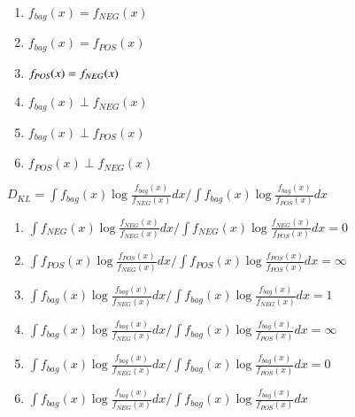 \begin{enumerate}
  \item $f_{bag}(x) = f_{NEG}(x)$
  \item $f_{bag}(x) = f_{POS}(x)$
  \item $f_{\text{\scriptsize{{\it POS}}}}(x) = f_{NEG}(x)$
  \item $f_{bag}(x) \perp f_{NEG}(x)$
  \item $f_{bag}(x) \perp f_{POS}(x)$
  \item $f_{POS}(x) \perp f_{NEG}(x)$
\end{enumerate}
$D_{KL} = \int f_{bag}(x) \log \frac{f_{bag}(x)}{f_{NEG}(x)} dx / \int f_{bag}(x) \log \frac{f_{bag}(x)}{f_{POS}(x)} dx$
\begin{enumerate}
  \item $\int f_{NEG}(x) \log \frac{f_{NEG}(x)}{f_{NEG}(x)} dx / \int f_{NEG}(x) \log \frac{f_{NEG}(x)}{f_{POS}(x)} dx = 0$
  \item $ \int f_{POS}(x) \log \frac{f_{POS}(x)}{f_{NEG}(x)} dx / \int f_{POS}(x) \log \frac{f_{POS}(x)}{f_{POS}(x)} dx = \infty$
  \item $\int f_{bag}(x) \log \frac{f_{bag}(x)}{f_{NEG}(x)} dx / \int f_{bag}(x) \log \frac{f_{bag}(x)}{f_{NEG}(x)} dx = 1$
  \item $\int f_{bag}(x) \log \frac{f_{bag}(x)}{f_{NEG}(x)} dx / \int f_{bag}(x) \log \frac{f_{bag}(x)}{f_{POS}(x)} dx = \infty$
  \item $\int f_{bag}(x) \log \frac{f_{bag}(x)}{f_{NEG}(x)} dx / \int f_{bag}(x) \log \frac{f_{bag}(x)}{f_{POS}(x)} dx = 0$
  \item $\int f_{bag}(x) \log \frac{f_{bag}(x)}{f_{NEG}(x)} dx / \int f_{bag}(x) \log \frac{f_{bag}(x)}{f_{POS}(x)} dx$\end{enumerate}